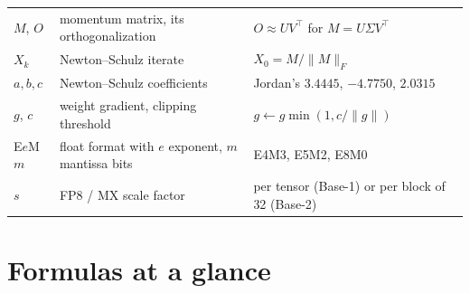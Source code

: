 \documentclass[11pt,letterpaper]{article}
\begin{document}
\begin{center}
\begin{tabular}{@{}l>{\raggedright\arraybackslash}p{4.8cm}>{\raggedright\arraybackslash}p{8.4cm}@{}}
$M$, $O$ & momentum matrix, its orthogonalization & $O\approx UV^{\top}$ for $M=U\Sigma V^{\top}$\\
$X_k$ & Newton--Schulz iterate & $X_0=M/\|M\|_F$\\
$a,b,c$ & Newton--Schulz coefficients & Jordan's $3.4445$, $-4.7750$, $2.0315$\\
$g$, $c$ & weight gradient, clipping threshold & $g\leftarrow g\min(1,c/\|g\|)$\\
E$e$M$m$ & float format with $e$ exponent, $m$ mantissa bits & E4M3, E5M2, E8M0\\
$s$ & FP8 / MX scale factor & per tensor (Base-1) or per block of 32 (Base-2)\\
\bottomrule
\end{tabular}
\end{center}

\clearpage
\section{Formulas at a glance}
\end{document}
